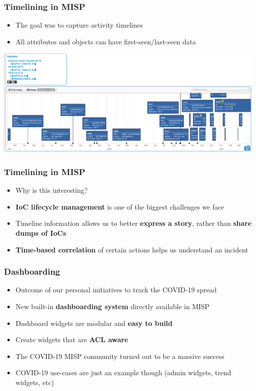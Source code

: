 \begin{frame}
\frametitle{Timelining in MISP}
\begin{itemize}
	\item The goal was to capture activity timelines
        \item All attributes and objects can have first-seen/last-seen data       
\end{itemize}
\includegraphics[scale=0.25]{images/timeline.png}
\end{frame}

\begin{frame}
\frametitle{Timelining in MISP}
\begin{itemize}
	\item Why is this interesting?
        \item {\bf IoC lifecycle management} is one of the biggest challenges we face
        \item Timeline information allows us to better {\bf express a story}, rather than {\bf share dumps of IoCs}
        \item {\bf Time-based correlation} of certain actions helps us understand an incident
\end{itemize}
\end{frame}

\begin{frame}
\frametitle{Dashboarding}
\begin{itemize}
	\item Outcome of our personal initiatives to track the COVID-19 spread
        \item New built-in {\bf dashboarding system} directly available in MISP
        \item Dashboard widgets are modular and {\bf easy to build}
        \item Create widgets that are {\bf ACL aware}
        \item The COVID-19 MISP community turned out to be a massive success
        \item COVID-19 use-cases are just an example though (admin widgets, trend widgets, etc)
\end{itemize}
\end{frame}

